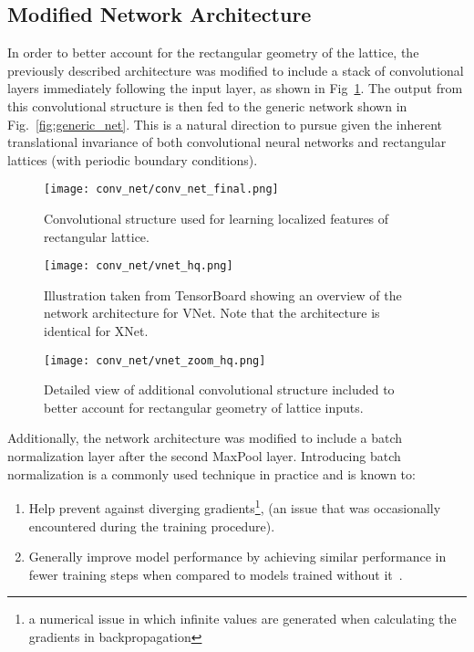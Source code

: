 \begin{appendices}
\section{Modified Network Architecture}%
\label{sec:l2hmc_modified_network}
%
In order to better account for the rectangular geometry of the lattice, the
previously described architecture was modified to include a stack of
convolutional layers immediately following the input layer, as shown in
Fig~\ref{fig:conv_net}.
%
The output from this convolutional structure is then fed to the generic network
shown in Fig.~\ref{fig:generic_net}.
%
This is a natural direction to pursue given the inherent translational
invariance of both  convolutional neural networks and rectangular lattices
(with periodic boundary conditions).
%
\begin{figure}[htpb]
\centering
\texttt{[image: conv\_net/conv\_net\_final.png]}
\caption{Convolutional structure used for learning localized features of
rectangular lattice.}%
\label{fig:conv_net} 
\end{figure}
%
\begin{figure}[htpb]
\centering
\texttt{[image: conv\_net/vnet\_hq.png]}
\caption{Illustration taken from TensorBoard showing an overview of the
network architecture for VNet. Note that the architecture is identical for
XNet.} \vspace{12pt}
\texttt{[image: conv\_net/vnet\_zoom\_hq.png]}
\caption{Detailed view of additional convolutional structure included to better
account for rectangular geometry of lattice inputs.}
\end{figure}
%
Additionally, the network architecture was modified to include a batch
normalization layer after the second MaxPool layer.
%
Introducing batch normalization is a commonly used technique in practice and
is known to:
\begin{enumerate}
\item Help prevent against diverging gradients\footnote{a numerical issue in
    which infinite values are generated when calculating the gradients in
  backpropagation}, (an issue that was occasionally encountered during the
  training procedure).
\item Generally improve model performance by achieving similar performance in
  fewer training steps when compared to models trained without
  it~\cite{Ioffe_Szegedy_2015}.
\end{enumerate}


\end{appendices}
